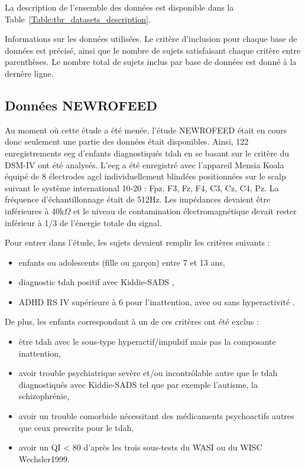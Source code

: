 La description de l'ensemble des données est disponible dans la Table~\ref{Table:tbr_datasets_description}.

\begin{table}[h!]
  \centering
  \caption{Informations sur les données utilisées. Le critère d'inclusion pour chaque base de données est précisé, ainsi que le nombre de sujets satisfaisant
	chaque critère entre parenthèses. Le nombre total de sujets inclus par base de données est donné à la dernère ligne.}
  
  \label{Table:tbr_datasets_description}
\end{table}

\subsection{Données NEWROFEED}

Au moment où cette étude a été menée, l'étude NEWROFEED était en cours donc seulement une partie des données était disponibles. Ainsi, 122 enregistrements 
\gls{eeg} d'enfants diagnostiqués \gls{tdah} en se basant sur le critère du DSM-IV \citep{DSM-4} ont été analysés. L'\gls{eeg} a 
été enregistré avec l'appareil Mensia Koala équipé de 8 électrodes \gls{agcl} individuellement blindées positionnées sur le scalp suivant
le système international 10-20 : Fpz, F3, Fz, F4, C3, Cz, C4, Pz. La fréquence d'échantillonnage était de 512Hz. Les impédances devaient être
inférieures à $40$k$\Omega$ et le niveau de contamination électromagnétique devait rester inférieur à 1/3 de l'énergie totale du signal. 

Pour entrer dans l'étude, les sujets devaient remplir les critères suivants :
\begin{itemize}
\item enfants ou adolescents (fille ou garçon) entre 7 et 13 ans,
\item diagnostic \gls{tdah} positif avec Kiddie-SADS \citep{Kaufman1997},
\item ADHD RS IV supérieure à 6 pour l'inattention, avec ou sans hyperactivité \citep{Pappas2006}.
\end{itemize}

De plus, les enfants correspondant à un de ces critères ont été exclus :
\begin{itemize}
\item être \gls{tdah} avec le sous-type hyperactif/impulsif mais pas la composante inattention,
\item avoir trouble psychiatrique sevère et/ou incontrôlable autre que le \gls{tdah} diagnostiqués avec Kiddie-SADS tel que par 
exemple l'autisme, la schizophrénie,
\item avoir un trouble comorbide nécessitant des médicaments psychoactifs autres que ceux prescrits pour le \gls{tdah},
\item avoir un QI < 80 d'après les trois sous-tests du WASI ou du WISC \gls{Wechsler1999}.
\end{itemize}

